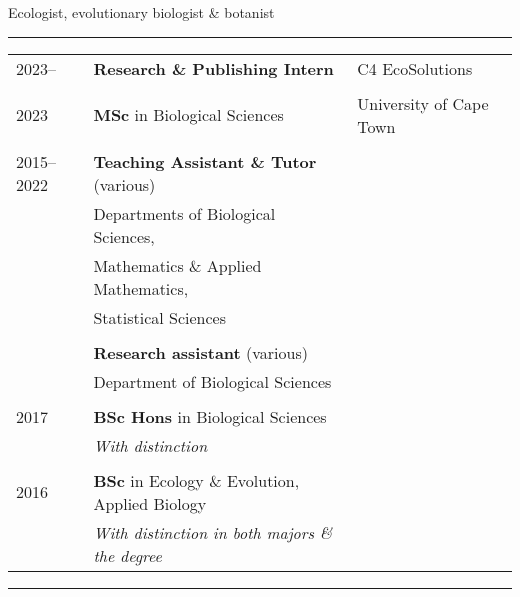 \documentclass[12pt]{article}
\begin{document}


\begin{center}
  {\large Ecologist, evolutionary biologist \& botanist}
\end{center}

\hrule %

\bigskip

\begin{tabular}{lll}
  2023--     & \textbf{Research \& Publishing Intern} & C4 EcoSolutions \\
             &                                        & \\
  2023       & \textbf{MSc} in Biological Sciences    & University of Cape Town \\
             &                                        & \\
  2015--2022 & \textbf{Teaching Assistant \& Tutor} (various)   & \\
             & Departments of Biological Sciences,              & \\
             & \hspace{1em} Mathematics \& Applied Mathematics, & \\
             & \hspace{1em} Statistical Sciences                & \\
             &                                                  & \\
             & \textbf{Research assistant} (various)            & \\
             & Department of Biological Sciences                & \\
             &                                                  & \\
  2017       & \textbf{BSc Hons} in Biological Sciences         & \\
             & \textit{With distinction}                        & \\
             &                                                  & \\
  2016       & \textbf{BSc} in Ecology \& Evolution, Applied Biology  & \\
             & \textit{With distinction in both majors \& the degree} &
\end{tabular}

\bigskip

\hrule %
\end{document}
